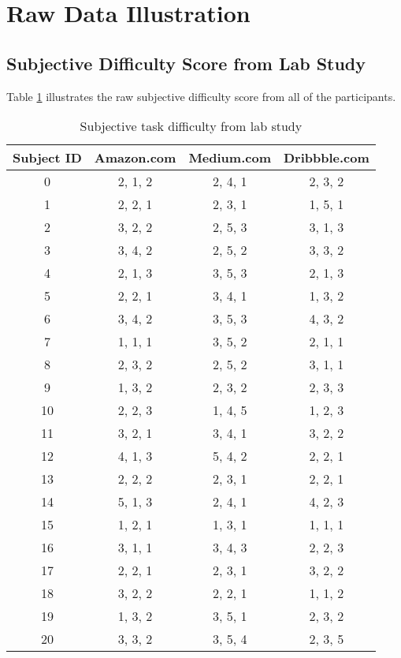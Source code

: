 \section{Raw Data Illustration}
\label{appendix:c}

\subsection{Subjective Difficulty Score from Lab Study}

Table \ref{table:diff-raw} illustrates the raw subjective difficulty score from all of the 
participants.

\begin{table}[H]
      \small
      \centering
      \setlength{\belowcaptionskip}{10pt}
      \caption{Subjective task difficulty from lab study}

      \begin{tabular}{cccc}
            \toprule
            \textbf{Subject ID} & \textbf{Amazon.com} & \textbf{Medium.com} & \textbf{Dribbble.com} \\
            \hline
            0 & 2, 1, 2 & 2, 4, 1 & 2, 3, 2 \\
            1 & 2, 2, 1 & 2, 3, 1 & 1, 5, 1 \\
            2 & 3, 2, 2 & 2, 5, 3 & 3, 1, 3 \\
            3 & 3, 4, 2 & 2, 5, 2 & 3, 3, 2 \\
            4 & 2, 1, 3 & 3, 5, 3 & 2, 1, 3 \\
            5 & 2, 2, 1 & 3, 4, 1 & 1, 3, 2 \\
            6 & 3, 4, 2 & 3, 5, 3 & 4, 3, 2 \\
            7 & 1, 1, 1 & 3, 5, 2 & 2, 1, 1 \\
            8 & 2, 3, 2 & 2, 5, 2 & 3, 1, 1 \\
            9 & 1, 3, 2 & 2, 3, 2 & 2, 3, 3 \\
            10 & 2, 2, 3 & 1, 4, 5 & 1, 2, 3 \\
            11 & 3, 2, 1 & 3, 4, 1 & 3, 2, 2 \\
            12 & 4, 1, 3 & 5, 4, 2 & 2, 2, 1 \\
            13 & 2, 2, 2 & 2, 3, 1 & 2, 2, 1 \\
            14 & 5, 1, 3 & 2, 4, 1 & 4, 2, 3 \\
            15 & 1, 2, 1 & 1, 3, 1 & 1, 1, 1 \\
            16 & 3, 1, 1 & 3, 4, 3 & 2, 2, 3 \\
            17 & 2, 2, 1 & 2, 3, 1 & 3, 2, 2 \\
            18 & 3, 2, 2 & 2, 2, 1 & 1, 1, 2 \\
            19 & 1, 3, 2 & 3, 5, 1 & 2, 3, 2 \\
            20 & 3, 3, 2 & 3, 5, 4 & 2, 3, 5 \\
            \bottomrule
      \end{tabular}
      \label{table:diff-raw}
\end{table}

